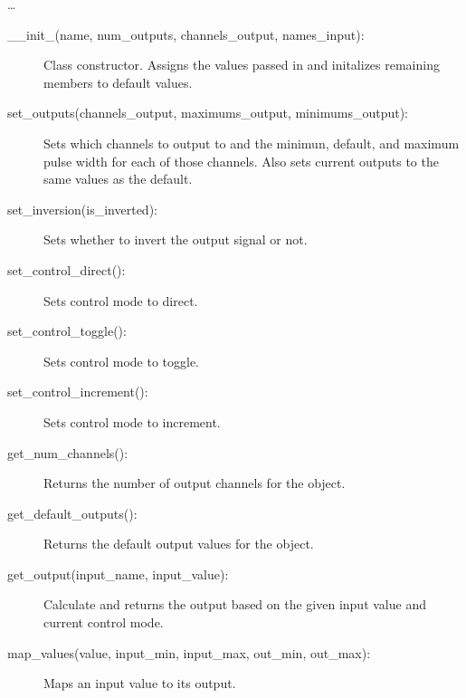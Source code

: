 \documentclass[letterpaper,10pt,english]{sphinxmanual}
\begin{document}
\begin{fulllineitems}
\sphinxAtStartPar
…

\sphinxAtStartPar
{}
\begin{description}
\item[{\_\_init\_(name, num\_outputs, channels\_output, names\_input):}] \leavevmode
\sphinxAtStartPar
Class constructor. Assigns the values passed in and initalizes remaining members to default values.

\item[{set\_outputs(channels\_output, maximums\_output, minimums\_output):}] \leavevmode
\sphinxAtStartPar
Sets which channels to output to and the minimun, default, and maximum pulse width for each of those channels.
Also sets current outputs to the same values as the default.

\item[{set\_inversion(is\_inverted):}] \leavevmode
\sphinxAtStartPar
Sets whether to invert the output signal or not.

\item[{set\_control\_direct():}] \leavevmode
\sphinxAtStartPar
Sets control mode to direct.

\item[{set\_control\_toggle():}] \leavevmode
\sphinxAtStartPar
Sets control mode to toggle.

\item[{set\_control\_increment():}] \leavevmode
\sphinxAtStartPar
Sets control mode to increment.

\item[{get\_num\_channels():}] \leavevmode
\sphinxAtStartPar
Returns the number of output channels for the object.

\item[{get\_default\_outputs():}] \leavevmode
\sphinxAtStartPar
Returns the default output values for the object.

\item[{get\_output(input\_name, input\_value):}] \leavevmode
\sphinxAtStartPar
Calculate and returns the output based on the given input value and current control mode.

\item[{map\_values(value, input\_min, input\_max, out\_min, out\_max):}] \leavevmode
\sphinxAtStartPar
Maps an input value to its output.

\end{description}


\end{fulllineitems}
\end{document}
